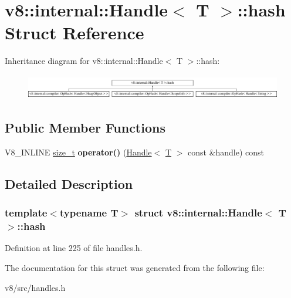\hypertarget{structv8_1_1internal_1_1Handle_1_1hash}{}\section{v8\+:\+:internal\+:\+:Handle$<$ T $>$\+:\+:hash Struct Reference}
\label{structv8_1_1internal_1_1Handle_1_1hash}
Inheritance diagram for v8\+:\+:internal\+:\+:Handle$<$ T $>$\+:\+:hash\+:\begin{figure}[H]
\begin{center}
\leavevmode
\includegraphics[height=1.088435cm]{structv8_1_1internal_1_1Handle_1_1hash}
\end{center}
\end{figure}
\subsection*{Public Member Functions}
\begin{DoxyCompactItemize}
\item 
\mbox{\label{structv8_1_1internal_1_1Handle_1_1hash_aa5dbf8ec4473120e00200e0e93957829}} 
V8\+\_\+\+I\+N\+L\+I\+NE \mbox{\hyperlink{classsize__t}{size\+\_\+t}} {\bfseries operator()} (\mbox{\hyperlink{classv8_1_1internal_1_1Handle}{Handle}}$<$ \mbox{\hyperlink{classv8_1_1internal_1_1torque_1_1T}{T}} $>$ const \&handle) const
\end{DoxyCompactItemize}


\subsection{Detailed Description}
\subsubsection*{template$<$typename T$>$\newline
struct v8\+::internal\+::\+Handle$<$ T $>$\+::hash}



Definition at line 225 of file handles.\+h.



The documentation for this struct was generated from the following file\+:\begin{DoxyCompactItemize}
\item 
v8/src/handles.\+h\end{DoxyCompactItemize}
